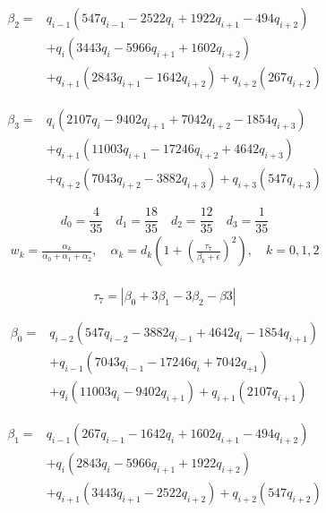 \begin{equation}
\begin{aligned}
\beta_{2}=& q_{i-1}\left(547 q_{i-1}-2522 q_{i}+1922 q_{i+1}-494 q_{i+2}\right) \\
&+q_{i}\left(3443 q_{i}-5966 q_{i+1}+1602 q_{i+2}\right) \\
&+q_{i+1}\left(2843 q_{i+1}-1642 q_{i+2}\right)+q_{i+2}\left(267 q_{i+2}\right)
\end{aligned}
\end{equation}

\begin{equation}
\begin{aligned}
\beta_{3}=& q_{i}\left(2107 q_{i}-9402 q_{i+1}+7042 q_{i+2}-1854 q_{i+3}\right) \\
&+q_{i+1}\left(11003 q_{i+1}-17246 q_{i+2}+4642 q_{i+3}\right) \\
&+q_{i+2}\left(7043 q_{i+2}-3882 q_{i+3}\right)+q_{i+3}\left(547 q_{i+3}\right)
\end{aligned}
\end{equation}

$$d_0=\frac{4}{35} \quad d_1=\frac{18}{35} \quad d_2=\frac{12}{35} \quad d_3=\frac{1}{35}$$
\begin{equation}
\begin{array}{l}
w_{k}=\frac{\alpha_{k}}{\alpha_{0}+\alpha_{1}+\alpha_{2}}, \quad \alpha_{k}=d_k\left(1+\left(\frac{\tau_7}{\beta_{k}+\epsilon}\right)^2\right), \quad k=0,1,2\\
\end{array}
\end{equation}

\begin{equation}
\tau_7=\left|\beta_0+3\beta_1-3\beta_2-\beta3\right|
\end{equation}

\begin{equation}
\begin{aligned}
\beta_{0}=& q_{i-2}\left(547 q_{i-2}-3882 q_{i-1}+4642 q_{i}-1854 q_{i+1}\right) \\
&+q_{i-1}\left(7043 q_{i-1}-17246 q_{i}+7042 q_{+1}\right) \\
&+q_{i}\left(11003 q_{i}-9402 q_{i+1}\right)+q_{i+1}\left(2107 q_{i+1}\right)
\end{aligned}
\end{equation}

\begin{equation}
\begin{aligned}
\beta_{1}=& q_{i-1}\left(267 q_{i-1}-1642 q_{i}+1602 q_{i+1}-494 q_{i+2}\right) \\
&+q_{i}\left(2843 q_{i}-5966 q_{i+1}+1922 q_{i+2}\right)\\
&+q_{i+1}\left(3443 q_{i+1}-2522 q_{i+2}\right)+q_{i+2}\left(547 q_{i+2}\right)
\end{aligned}
\end{equation}

